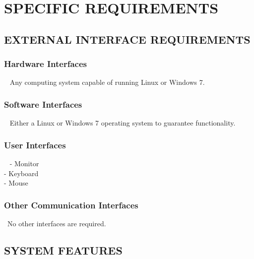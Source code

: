 \documentclass[twoside,letterpaper]{article}
\begin{document}
\clearpage\section[SPECIFIC REQUIREMENTS]{\rmfamily\bfseries
SPECIFIC REQUIREMENTS}

\subsection[EXTERNAL INTERFACE REQUIREMENTS]{\rmfamily\bfseries
EXTERNAL INTERFACE REQUIREMENTS}

\subsubsection[Hardware Interfaces]{\rmfamily\bfseries
Hardware Interfaces}
{
\foreignlanguage{english}{\ }\foreignlanguage{english}
{
Any computing system capable of running Linux or Windows 7.}}

\subsubsection[Software Interfaces]{\rmfamily\bfseries
Software Interfaces}
{ \foreignlanguage{english}{\ }\foreignlanguage{english}
{
Either a Linux or Windows 7 operating system to guarantee functionality.
}}

\subsubsection[User Interfaces]{\rmfamily\bfseries
User Interfaces}
{
\foreignlanguage{english}{\ }\foreignlanguage{english}
{
- Monitor
\\- Keyboard
\\- Mouse}}

\subsubsection[Other Communication
Interfaces]{\rmfamily\bfseries
Other Communication Interfaces}
{
\foreignlanguage{english}{\ }\foreignlanguage{english}{No other interfaces are required. }}





\clearpage\setcounter{page}{1}\pagestyle{Convertv}

\subsection[SYSTEM FEATURES]{\rmfamily\bfseries
SYSTEM FEATURES}
\end{document}
